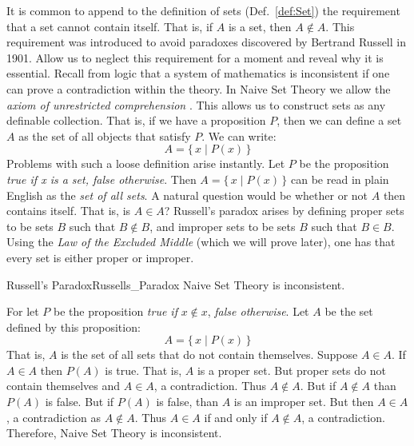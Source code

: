     It is common to append to the definition of sets (Def.~\ref{def:Set}) the
    requirement that a set cannot contain itself. That is, if $A$ is a set, then
    $A\notin{A}$. This requirement was introduced to avoid paradoxes discovered
    by Bertrand Russell in 1901. Allow us to neglect
    this requirement for a moment and reveal why it is essential. Recall from
    logic that a system of mathematics is inconsistent if one can prove a
    contradiction within the theory. In Naive Set Theory
    we allow the \textit{axiom of unrestricted comprehension}%
    . This allows us to construct
    sets as any definable collection. That is, if we have a
    proposition $P$, then we can define a set $A$ as the set
    of all objects that satisfy $P$. We can write:
    \begin{equation}
        A=\big\{\,x\;|\;P(x)\,\big\}
    \end{equation}
    Problems with such a loose definition arise instantly. Let $P$ be the
    proposition \textit{true if x is a set, false otherwise}. Then
    $A=\{\,x\;|\;P(x)\,\}$ can be read in plain English as the
    \textit{set of all sets}. A natural question would be
    whether or not $A$ then contains itself. That is, is $A\in{A}$? Russell's
    paradox arises by defining proper sets to be sets $B$ such that
    $B\notin{B}$, and improper sets to be sets $B$ such that $B\in{B}$. Using
    the \textit{Law of the Excluded Middle}
    (which we will prove later), one has that every set is either proper or
    improper.
    \begin{ftheorem}{Russell's Paradox}{Russells_Paradox}
        Naive Set Theory is inconsistent.
    \end{ftheorem}
    \begin{bproof}
        For let $P$ be the proposition \textit{true if} $x\notin{x}$,
        \textit{false otherwise}. Let $A$ be the set defined by this
        proposition:
        \begin{equation}
            A=\big\{\,x\;|\;P(x)\,\big\}
        \end{equation}
        That is, $A$ is the set of all sets that do not contain themselves.
        Suppose $A\in{A}$. If $A\in{A}$ then $P(A)$ is true. That is, $A$ is a
        proper set. But proper sets do not contain themselves and $A\in{A}$, a
        contradiction. Thus $A\notin{A}$. But if $A\notin{A}$ than $P(A)$ is
        false. But if $P(A)$ is false, than $A$ is an improper set. But then
        $A\in{A}$, a contradiction as $A\notin{A}$. Thus $A\in{A}$ if and only
        if $A\notin{A}$, a contradiction. Therefore, Naive Set Theory is
        inconsistent.
    \end{bproof}
